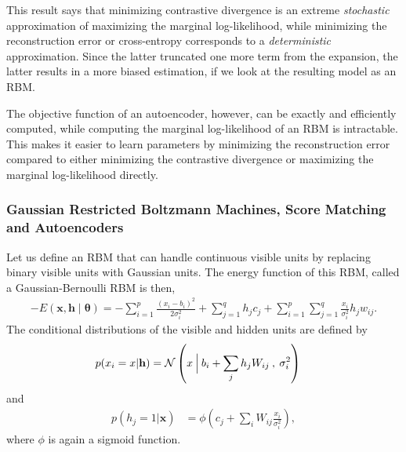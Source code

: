 \documentclass{now}
\newcommand{\vect}[1]{\mathbf{#1}}
\newcommand{\vects}[1]{\boldsymbol{#1}}
\newcommand{\vh}[0]{\vect{h}}
\newcommand{\vx}[0]{\vect{x}}
\newcommand{\TT}[0]{{\vects{\theta}}}
\newcommand{\N}[0]{\mathcal{N}}
\begin{document}
This result says that minimizing contrastive divergence is
an extreme \textit{stochastic} approximation of maximizing
the marginal log-likelihood, while minimizing the
reconstruction error or cross-entropy corresponds to a
\textit{deterministic} approximation. Since the latter
truncated one more term from the expansion, the latter
results in a more biased estimation, if we look at
the resulting model as an RBM. 

The objective function of an autoencoder, however,
    can be exactly and
efficiently computed, while computing the marginal
log-likelihood of an RBM is intractable. This makes it
easier to learn parameters by minimizing the reconstruction
error compared to either minimizing the contrastive
divergence or maximizing the marginal log-likelihood
directly.

\subsubsection{Gaussian Restricted Boltzmann Machines, Score
Matching and Autoencoders}
\label{sec:grbm}

Let us define an RBM that can handle continuous visible
units by replacing binary visible units with Gaussian units.
The energy function of this RBM, called a Gaussian-Bernoulli
RBM \citep[GRBM,][]{Hinton2006} is then,
\begin{align}
    \label{eq:grbm_energy}
    -E(\vx, \vh \mid \TT) = -\sum_{i=1}^p \frac{(x_i -
    b_i)^2}{2\sigma_i^2} + \sum_{j=1}^q h_j c_j +
    \sum_{i=1}^p \sum_{j=1}^q \frac{x_i}{\sigma_i^2} h_j
    w_{ij}.
\end{align}
The conditional distributions of the visible and hidden
units are defined by
\begin{align}
    \label{grbm:conditional_visible}
    p(x_i = x | \vh) &= \N \left(x \:\Bigl|\: b_i + 
    \sum_j h_j W_{ij} \:,\: \sigma_i^2 \right)
\end{align}
and
\begin{align}
    \label{grbm:conditional_hidden}
    p(h_j = 1 | \vx) &= \phi \left( c_j +  \sum_i W_{ij}
    \frac{x_i}{\sigma_i^2} \right),
\end{align}
where $\phi$ is again a sigmoid function.
\end{document}
